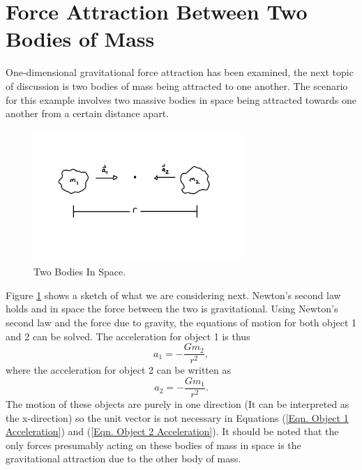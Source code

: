 \documentclass[twocolumn]{article}
\begin{document}
\section{Force Attraction Between Two Bodies of Mass}
One-dimensional gravitational force attraction has been examined, the next topic of discussion is two bodies of mass being attracted to one another. The scenario for this example involves two massive bodies in space being attracted towards one another from a certain distance apart.
\begin{figure}[ht]
    \centering
    \includegraphics[width=8cm, height=5cm]{Figures/2-Body Cartoon.png}
    \caption{\small{Two Bodies In Space.}}
    \label{Fig. 2-Body Cartoon}
\end{figure}
\par \noindent
Figure \ref{Fig. 2-Body Cartoon} shows a sketch of what we are considering next. Newton's second law holds and in space the force between the two is gravitational. Using Newton's second law and the force due to gravity, the equations of motion for both object 1 and 2 can be solved. The acceleration for object 1 is thus
\begin{equation}\label{Eqn. Object 1 Acceleration}
a_{1}=-\frac{Gm_{2}}{r^2},
\end{equation}
where the acceleration for object 2 can be written as
\begin{equation}\label{Eqn. Object 2 Acceleration}
a_{2}=-\frac{Gm_{1}}{r^2}.
\end{equation}
The motion of these objects are purely in one direction (It can be interpreted as the x-direction) so the unit vector is not necessary in Equations (\ref{Eqn. Object 1 Acceleration}) and (\ref{Eqn. Object 2 Acceleration}). It should be noted that the only forces presumably acting on these bodies of mass in space is the gravitational attraction due to the other body of mass.
\end{document}
